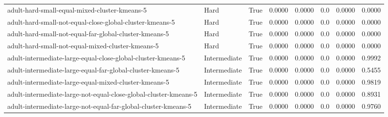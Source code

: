 \begin{tabular}{lllrrrrr}
                                          adult-hard-small-equal-mixed-cluster-kmeans-5 &         Hard &        True &                0.0000 &                0.0000 &                           0.0 &                        0.0000 &                        0.0000 \\
                               adult-hard-small-not-equal-close-global-cluster-kmeans-5 &         Hard &        True &                0.0000 &                0.0000 &                           0.0 &                        0.0000 &                        0.0000 \\
                                 adult-hard-small-not-equal-far-global-cluster-kmeans-5 &         Hard &        True &                0.0000 &                0.0000 &                           0.0 &                        0.0000 &                        0.0000 \\
                                      adult-hard-small-not-equal-mixed-cluster-kmeans-5 &         Hard &        True &                0.0000 &                0.0000 &                           0.0 &                        0.0000 &                        0.0000 \\
                           adult-intermediate-large-equal-close-global-cluster-kmeans-5 & Intermediate &        True &                0.0000 &                0.0000 &                           0.0 &                        0.0000 &                        0.9992 \\
                             adult-intermediate-large-equal-far-global-cluster-kmeans-5 & Intermediate &        True &                0.0000 &                0.0000 &                           0.0 &                        0.0000 &                        0.5455 \\
                                  adult-intermediate-large-equal-mixed-cluster-kmeans-5 & Intermediate &        True &                0.0000 &                0.0000 &                           0.0 &                        0.0000 &                        0.9819 \\
                       adult-intermediate-large-not-equal-close-global-cluster-kmeans-5 & Intermediate &        True &                0.0000 &                0.0000 &                           0.0 &                        0.0000 &                        0.8931 \\
                         adult-intermediate-large-not-equal-far-global-cluster-kmeans-5 & Intermediate &        True &                0.0000 &                0.0000 &                           0.0 &                        0.0000 &                        0.9760 \\

\end{tabular}
